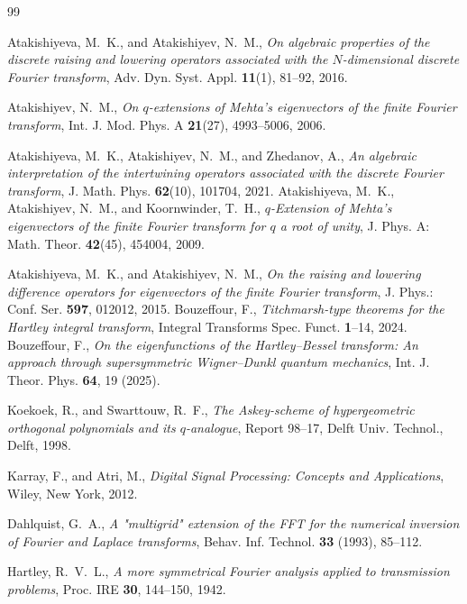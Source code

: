 \documentclass[12 pt]{amsart}
\numberwithin{equation}{section}
\begin{document}
\begin{thebibliography}{99}

Atakishiyeva, M.~K., and Atakishiyev, N.~M.,
\textit{On algebraic properties of the discrete raising and lowering operators associated with the $N$-dimensional discrete Fourier transform},
Adv. Dyn. Syst. Appl. \textbf{11}(1), 81--92, 2016.

Atakishiyev, N.~M.,
\textit{On $q$-extensions of Mehta's eigenvectors of the finite Fourier transform},
Int. J. Mod. Phys. A \textbf{21}(27), 4993--5006, 2006.

Atakishiyeva, M.~K., Atakishiyev, N.~M., and Zhedanov, A.,
\textit{An algebraic interpretation of the intertwining operators associated with the discrete Fourier transform},
J. Math. Phys. \textbf{62}(10), 101704, 2021.
Atakishiyeva, M.~K., Atakishiyev, N.~M., and Koornwinder, T.~H.,
\textit{$q$-Extension of Mehta's eigenvectors of the finite Fourier transform for $q$ a root of unity},
J. Phys. A: Math. Theor. \textbf{42}(45), 454004, 2009.




Atakishiyeva, M.~K., and Atakishiyev, N.~M.,
\textit{On the raising and lowering difference operators for eigenvectors of the finite Fourier transform},
J. Phys.: Conf. Ser. \textbf{597}, 012012, 2015.
Bouzeffour, F.,
\textit{Titchmarsh-type theorems for the Hartley integral transform},
Integral Transforms Spec. Funct. \textbf{1}–14, 2024.
Bouzeffour, F.,
\textit{On the eigenfunctions of the Hartley–Bessel transform: An approach through supersymmetric Wigner–Dunkl quantum mechanics},
Int. J. Theor. Phys. \textbf{64}, 19 (2025).



Koekoek, R., and Swarttouw, R.~F.,
\textit{The Askey-scheme of hypergeometric orthogonal polynomials and its $q$-analogue},
Report 98--17, Delft Univ. Technol., Delft, 1998.

Karray, F., and Atri, M.,
\textit{Digital Signal Processing: Concepts and Applications},
Wiley, New York, 2012.

Dahlquist, G.~A.,
\textit{A "multigrid" extension of the FFT for the numerical inversion of Fourier and Laplace transforms},
Behav. Inf. Technol. \textbf{33} (1993), 85--112.

Hartley, R.~V.~L.,
\textit{A more symmetrical Fourier analysis applied to transmission problems},
Proc. IRE \textbf{30}, 144--150, 1942.


\end{thebibliography}
\end{document}
